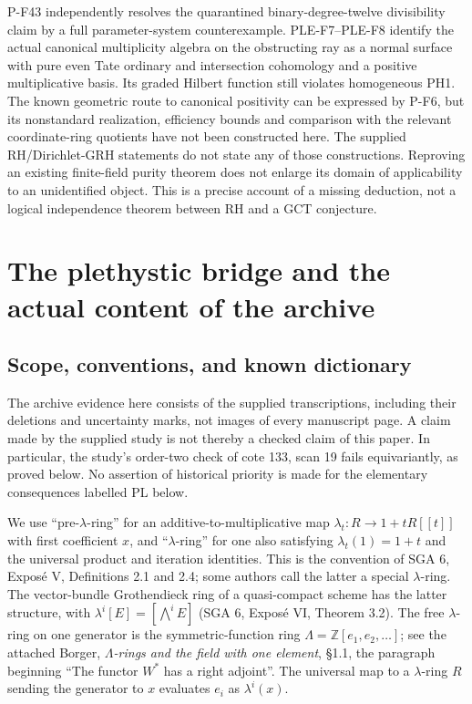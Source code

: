 \documentclass[11pt,a4paper]{article}
\begin{document}
P-F43 independently resolves the quarantined binary-degree-twelve
divisibility claim by a full parameter-system counterexample.
PLE-F7--PLE-F8 identify the actual canonical multiplicity algebra on
the obstructing ray as a normal surface with pure even Tate ordinary
and intersection cohomology and a positive multiplicative basis.
Its graded Hilbert function still violates homogeneous PH1.
The known geometric route to
canonical positivity can be expressed by P-F6, but its nonstandard
realization, efficiency bounds and comparison with the relevant
coordinate-ring quotients have not been constructed here.
The supplied RH/Dirichlet-GRH statements do not state any of those
constructions. Reproving an existing finite-field purity theorem does
not enlarge its domain of applicability to an unidentified object.
This is a precise account of a missing deduction, not a logical
independence theorem between RH and a GCT conjecture.


\section{The plethystic bridge and the actual content of the archive}
\label{sec:plethysm-bridge}

\subsection{Scope, conventions, and known dictionary}
The archive evidence here consists of the supplied transcriptions, including their
deletions and uncertainty marks, not images of every manuscript page. A claim made
by the supplied study is not thereby a checked claim of this paper. In particular,
the study's order-two check of cote 133, scan 19 fails equivariantly, as proved
below. No assertion of historical priority is made for the elementary consequences
labelled PL below.

We use ``pre-$\lambda$-ring'' for an additive-to-multiplicative map
$\lambda_t:R\longrightarrow 1+tR[[t]]$ with first coefficient $x$, and
``$\lambda$-ring'' for one also satisfying $\lambda_t(1)=1+t$ and the
universal product and iteration identities. This is the convention of SGA 6, Expos\'e V,
Definitions 2.1 and 2.4; some authors call the latter a special $\lambda$-ring.
The vector-bundle Grothendieck ring of a quasi-compact scheme has the latter
structure, with $\lambda^i[E]=[\bigwedge^iE]$ (SGA 6, Expos\'e VI,
Theorem 3.2). The free $\lambda$-ring on one generator is the symmetric-function
ring $\Lambda=\mathbb Z[e_1,e_2,\ldots]$; see the attached Borger,
\emph{$\Lambda$-rings and the field with one element}, \S1.1, the paragraph
beginning ``The functor $W^*$ has a right adjoint''. The universal map to a
$\lambda$-ring $R$ sending the generator to $x$ evaluates $e_i$ as $\lambda^i(x)$.
\end{document}
